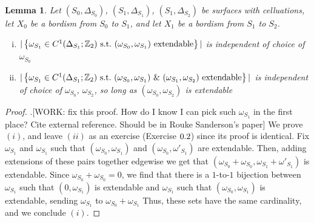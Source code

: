 \documentclass{article}
\newtheorem{lemma}{Lemma}[section]
\theoremstyle{definition}
\numberwithin{figure}{section}
\begin{document}
\begin{lemma}\label{independence} Let $(S_0,\Delta_{S_0})$, $(S_1,\Delta_{S_1})$, $(S_1,\Delta_{S_2})$ be surfaces with celluations, let $X_0$ be a bordism from $S_0$ to $S_1$, and let $X_1$ be a bordism from $S_1$ to $S_2$.

\begin{enumerate}[(i)]
\item $|\left\{\omega_{S_1}\in C^1(\Delta_{S_1};\mathbb{Z}_2) \,\,\mathrm{s.t.}\,\, (\omega_{S_0},\omega_{S_1}) \text{ extendable}\right\}|$ is independent of choice of $\omega_{S_0}$
\item $|\left\{\omega_{S_1}\in C^1(\Delta_{S_1};\mathbb{Z}_2)\,\,\mathrm{s.t.}\,\, (\omega_{S_0},\omega_{S_1})\,\, \& \,\,(\omega_{S_1},\omega_{S_2})\text{ extendable}\right\}|$ is independent of choice of $\omega_{S_0}$, $\omega_{S_2}$, so long as $(\omega_{S_0},\omega_{S_2})$ is extendable
\end{enumerate}
\end{lemma}
\begin{proof} .[WORK: fix this proof. How do I know I can pick such $\omega_{S_1}$ in the first place? Cite external reference. Should be in Rouke Sanderson's paper] We prove $(i)$, and leave $(ii)$ as an exercise (Exercise $\thesection.2$) since its proof is identical. Fix $\omega_{S_1}$ and $\omega_{S_1}$ such that $(\omega_{S_0},\omega_{S_1})$ and $(\omega_{S_0},\omega'_{S_1})$ are extendable. Then, adding extensions of these pairs together edgewise we get that $(\omega_{S_0}+\omega_{S_0},\omega_{S_1}+\omega'_{S_1})$ is extendable. Since $\omega_{S_0}+\omega_{S_0}=0$, we find that there is a $1$-to-$1$ bijection between $\omega_{S_1}$ such that $(0,\omega_{S_1})$ is extendable and $\omega_{S_1}$ such that $(\omega_{S_0},\omega_{S_1})$ is extendable, sending $\omega_{S_1}$ to $\omega_{S_0}+\omega_{S_1}$ Thus, these sets have the same cardinality, and we conclude $(i)$.
\end{proof}
\end{document}
